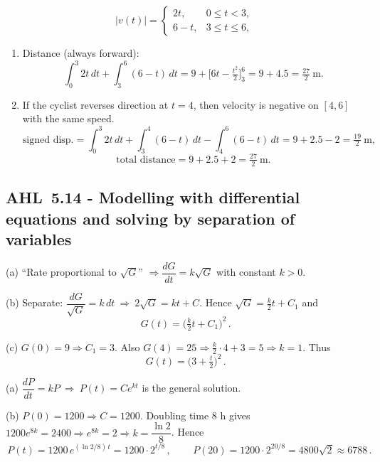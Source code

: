 \documentclass[11pt]{article}
\def\textbf#1{#1}%
\newcommand{\tocsubsection}[1]{\subsection{#1}}
\begin{document}
\begin{solution}
\[
|v(t)|=\begin{cases}
2t,& 0\le t<3,\\[2pt]
6-t,& 3\le t\le 6,
\end{cases}
\]
\begin{enumerate}
\item Distance (always forward):
\[
\int_{0}^{3}2t\,dt+\int_{3}^{6}(6-t)\,dt
=9+\Big[6t-\tfrac{t^{2}}{2}\Big]_{3}^{6}
=9+4.5=\boxed{\tfrac{27}{2}\ \text{m}}.
\]
\item If the cyclist reverses direction at \(t=4\), then velocity is negative on \([4,6]\) with the same speed.
\[
\text{signed disp.}=\int_{0}^{3}\!2t\,dt+\int_{3}^{4}\!(6-t)\,dt-\int_{4}^{6}\!(6-t)\,dt
=9+2.5-2=\boxed{\tfrac{19}{2}\ \text{m}},
\]
\[
\text{total distance}=9+2.5+2=\boxed{\tfrac{27}{2}\ \text{m}}.
\]
\end{enumerate}
\end{solution}




\tocsubsection{AHL 5.14 - Modelling with differential equations and solving by separation of variables}

\begin{solution}
\textbf{(a)} “Rate proportional to $\sqrt{G}$” $\Rightarrow \dfrac{dG}{dt}=k\sqrt{G}$ with constant $k>0$.

\textbf{(b)} Separate: $\dfrac{dG}{\sqrt{G}}=k\,dt\ \Rightarrow\ 2\sqrt{G}=kt+C$.
Hence $\displaystyle \sqrt{G}=\frac{k}{2}t+C_1$ and
\[
\boxed{\,G(t)=\Big(\tfrac{k}{2}t+C_1\Big)^2\,}.
\]

\textbf{(c)} $G(0)=9\Rightarrow C_1=3$. Also $G(4)=25\Rightarrow \tfrac{k}{2}\cdot4+3=5\Rightarrow k=1$.
Thus
\[
\boxed{\,G(t)=\Big(3+\tfrac{t}{2}\Big)^2\,}.
\]
\end{solution}

\begin{solution}
\textbf{(a)} $\dfrac{dP}{dt}=kP \ \Rightarrow\ P(t)=C e^{kt}$ is the general solution.

\textbf{(b)} $P(0)=1200\Rightarrow C=1200$.  Doubling time $8$ h gives
$1200e^{8k}=2400\Rightarrow e^{8k}=2\Rightarrow k=\dfrac{\ln 2}{8}$.
Hence
\[
\boxed{\,P(t)=1200\,e^{(\ln 2/8)\,t}=1200\cdot 2^{t/8}\,},\qquad
\boxed{\,P(20)=1200\cdot 2^{20/8}=4800\sqrt{2}\approx 6788\,}.
\]
\end{solution}
\end{document}
